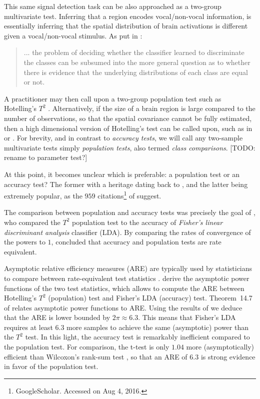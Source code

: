 \documentclass[12pt,a4paper]{article}
\theoremstyle{definition}
\begin{document}
This same signal detection task can be also approached as a two-group multivariate test.
Inferring that a region encodes vocal/non-vocal information, is essentially inferring that the spatial distribution of brain activations is different given a vocal/non-vocal stimulus. 
As put in \cite{pereira_machine_2009}: 
\begin{quote}
... the problem of deciding whether the classifier learned to discriminate the classes can be subsumed into the more general question as to whether there is evidence that the underlying distributions of each class are equal or not.
\end{quote}
A practitioner may then call upon a two-group population test such as Hotelling's $T^2$ \citep{anderson_introduction_2003}.
Alternatively, if the size of a brain region is large compared to the number of observations, so that the spatial covariance cannot be fully estimated, then a high dimensional version of Hotelling's test can be called upon, such as in \cite{schafer_shrinkage_2005} or \cite{srivastava_multivariate_2007}.
For brevity, and in contrast to \emph{accuracy tests}, we will call any two-sample multivariate tests simply \emph{population tests}, also termed \emph{class comparisons}. [TODO: rename to parameter test?]


At this point, it becomes unclear which is preferable: a population test or an accuracy test?
The former with a heritage dating back to \cite{hotelling_generalization_1931}, and the latter being extremely popular, as the $959$ citations\footnote{GoogleScholar. Accessed on Aug 4, 2016.} of \cite{kriegeskorte_information-based_2006} suggest. 

The comparison between population and accuracy tests was precisely the goal of \cite{ramdas_classification_2016}, who compared the $T^2$ population test to the accuracy of \emph{Fisher's linear discriminant analysis} classifier (LDA). 
By comparing the rates of convergence of the powers to $1$, \cite{ramdas_classification_2016} concluded that accuracy and population tests are rate equivalent. 

Asymptotic relative efficiency measures (ARE) are typically used by statisticians to compare between rate-equivalent test statistics \citep{vaart_asymptotic_1998}.
\cite{ramdas_classification_2016} derive the asymptotic power functions of the two test statistics, which allows to compute the ARE between Hotelling's $T^2$ (population) test and Fisher's LDA (accuracy) test.
Theorem~14.7 of \cite{vaart_asymptotic_1998} relates asymptotic power functions to ARE.
Using the results of \cite{ramdas_classification_2016} we deduce that the ARE is lower bounded by $2 \pi \approx 6.3$. 
This means that Fisher's LDA requires at least $6.3$ more samples to achieve the same (asymptotic) power than the $T^2$ test. 
In this light, the accuracy test is remarkably inefficient compared to the population test.  
For comparison, the t-test is only $1.04$ more (asymptotically) efficient than Wilcoxon's rank-sum test \citep{lehmann_parametric_2009}, so that an ARE of $6.3$ is strong evidence in favor of the population test. 
\end{document}
